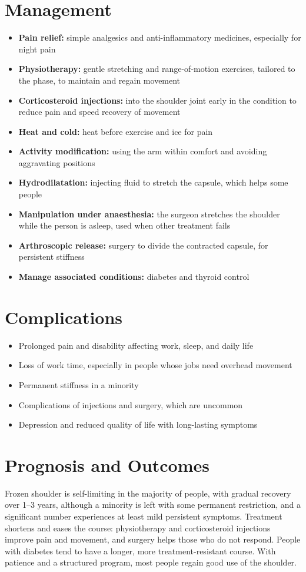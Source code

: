 \section*{Management}
\begin{itemize}
    \item \textbf{Pain relief:} simple analgesics and anti-inflammatory medicines, especially for night pain
    \item \textbf{Physiotherapy:} gentle stretching and range-of-motion exercises, tailored to the phase, to maintain and regain movement
    \item \textbf{Corticosteroid injections:} into the shoulder joint early in the condition to reduce pain and speed recovery of movement
    \item \textbf{Heat and cold:} heat before exercise and ice for pain
    \item \textbf{Activity modification:} using the arm within comfort and avoiding aggravating positions
    \item \textbf{Hydrodilatation:} injecting fluid to stretch the capsule, which helps some people
    \item \textbf{Manipulation under anaesthesia:} the surgeon stretches the shoulder while the person is asleep, used when other treatment fails
    \item \textbf{Arthroscopic release:} surgery to divide the contracted capsule, for persistent stiffness
    \item \textbf{Manage associated conditions:} diabetes and thyroid control
\end{itemize}

\section*{Complications}
\begin{itemize}
    \item Prolonged pain and disability affecting work, sleep, and daily life
    \item Loss of work time, especially in people whose jobs need overhead movement
    \item Permanent stiffness in a minority
    \item Complications of injections and surgery, which are uncommon
    \item Depression and reduced quality of life with long-lasting symptoms
\end{itemize}

\section*{Prognosis and Outcomes}
Frozen shoulder is self-limiting in the majority of people, with gradual recovery over 1--3 years, although a minority is left with some permanent restriction, and a significant number experiences at least mild persistent symptoms. Treatment shortens and eases the course: physiotherapy and corticosteroid injections improve pain and movement, and surgery helps those who do not respond. People with diabetes tend to have a longer, more treatment-resistant course. With patience and a structured program, most people regain good use of the shoulder.

